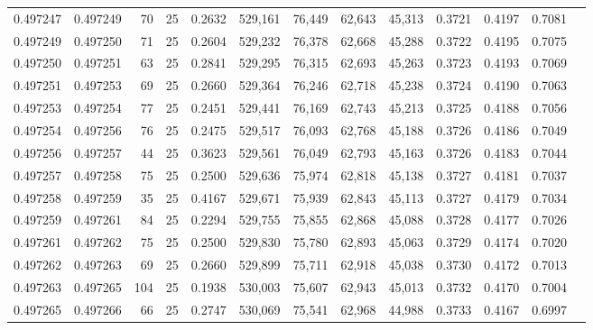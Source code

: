 \begin{tabular}{rrrrrrrrrrrrr}
0.497247 & 0.497249 &    70 &  25 &                                     0.2632 & 529,161 &  76,449 &  62,643 &  45,313 & 0.3721 & 0.4197 & 0.7081 \\
0.497249 & 0.497250 &    71 &  25 &                                     0.2604 & 529,232 &  76,378 &  62,668 &  45,288 & 0.3722 & 0.4195 & 0.7075 \\
0.497250 & 0.497251 &    63 &  25 &                                     0.2841 & 529,295 &  76,315 &  62,693 &  45,263 & 0.3723 & 0.4193 & 0.7069 \\
0.497251 & 0.497253 &    69 &  25 &                                     0.2660 & 529,364 &  76,246 &  62,718 &  45,238 & 0.3724 & 0.4190 & 0.7063 \\
0.497253 & 0.497254 &    77 &  25 &                                     0.2451 & 529,441 &  76,169 &  62,743 &  45,213 & 0.3725 & 0.4188 & 0.7056 \\
0.497254 & 0.497256 &    76 &  25 &                                     0.2475 & 529,517 &  76,093 &  62,768 &  45,188 & 0.3726 & 0.4186 & 0.7049 \\
0.497256 & 0.497257 &    44 &  25 &                                     0.3623 & 529,561 &  76,049 &  62,793 &  45,163 & 0.3726 & 0.4183 & 0.7044 \\
0.497257 & 0.497258 &    75 &  25 &                                     0.2500 & 529,636 &  75,974 &  62,818 &  45,138 & 0.3727 & 0.4181 & 0.7037 \\
0.497258 & 0.497259 &    35 &  25 &                                     0.4167 & 529,671 &  75,939 &  62,843 &  45,113 & 0.3727 & 0.4179 & 0.7034 \\
0.497259 & 0.497261 &    84 &  25 &                                     0.2294 & 529,755 &  75,855 &  62,868 &  45,088 & 0.3728 & 0.4177 & 0.7026 \\
0.497261 & 0.497262 &    75 &  25 &                                     0.2500 & 529,830 &  75,780 &  62,893 &  45,063 & 0.3729 & 0.4174 & 0.7020 \\
0.497262 & 0.497263 &    69 &  25 &                                     0.2660 & 529,899 &  75,711 &  62,918 &  45,038 & 0.3730 & 0.4172 & 0.7013 \\
0.497263 & 0.497265 &   104 &  25 &                                     0.1938 & 530,003 &  75,607 &  62,943 &  45,013 & 0.3732 & 0.4170 & 0.7004 \\
0.497265 & 0.497266 &    66 &  25 &                                     0.2747 & 530,069 &  75,541 &  62,968 &  44,988 & 0.3733 & 0.4167 & 0.6997 \\

\end{tabular}
